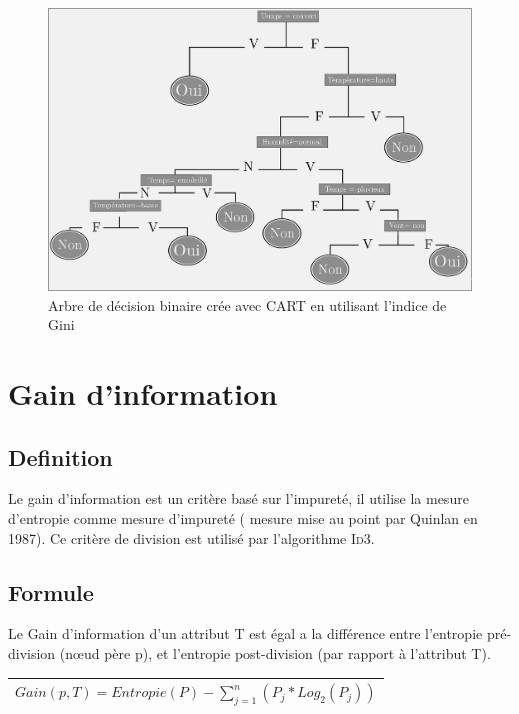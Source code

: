 \documentclass[a4paper, 11pt]{report}
\begin{document}
\begin{figure}[!h]
\begin{center}
\includegraphics[scale=2]{figure_gini}
\end{center}
\caption{Arbre de décision binaire crée avec CART en utilisant l'indice de Gini}
\end{figure}



\chapter{Gain d'information}

\section{Definition}
Le gain d'information est un critère basé sur l'impureté, il utilise la mesure d'entropie comme mesure d'impureté ( mesure mise au point par Quinlan en 1987). Ce critère de division est utilisé par l'algorithme \textsc{Id3}.

\section{Formule}
Le Gain d'information d'un attribut T est égal a la différence entre l'entropie pré-division (nœud père p), et l'entropie post-division (par rapport à l'attribut T).
\begin{center}
\begin{tabular}{| c |}
\hline
$Gain(p,T) = Entropie(P) - \sum_{j=1}^n (P_j * Log_2(P_j)) $\\
\hline
\end{tabular}
\end{center}
\end{document}
